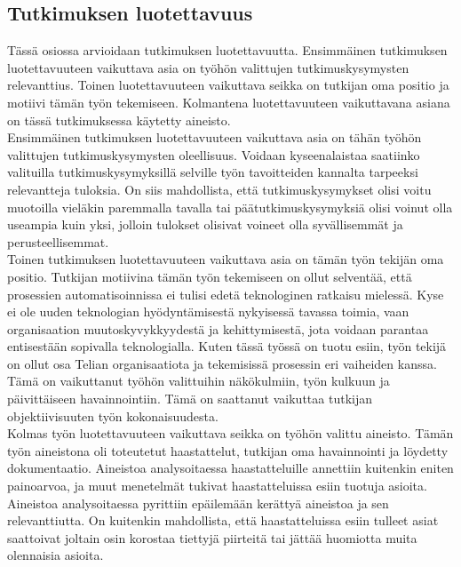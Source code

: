 \documentclass[finnish,12pt,a4paper,pdftex]{article}
\begin{document}
\subsection{Tutkimuksen luotettavuus}
Tässä osiossa arvioidaan tutkimuksen luotettavuutta. Ensimmäinen tutkimuksen luotettavuuteen vaikuttava asia on työhön valittujen tutkimuskysymysten relevanttius. Toinen luotettavuuteen vaikuttava seikka on tutkijan oma positio ja motiivi tämän työn tekemiseen. Kolmantena luotettavuuteen vaikuttavana asiana on tässä tutkimuksessa käytetty aineisto.\\

 Ensimmäinen tutkimuksen luotettavuuteen vaikuttava asia on tähän työhön valittujen tutkimuskysymysten oleellisuus. Voidaan kyseenalaistaa saatiinko valituilla tutkimuskysymyksillä selville työn tavoitteiden kannalta tarpeeksi relevantteja tuloksia. On siis mahdollista, että tutkimuskysymykset olisi voitu muotoilla vieläkin paremmalla tavalla tai päätutkimuskysymyksiä olisi voinut olla useampia kuin yksi, jolloin tulokset olisivat voineet olla syvällisemmät ja perusteellisemmat. \\

\noindent Toinen tutkimuksen luotettavuuteen vaikuttava asia on tämän työn tekijän oma positio. Tutkijan motiivina tämän työn tekemiseen on ollut selventää, että prosessien automatisoinnissa ei tulisi edetä teknologinen ratkaisu mielessä. Kyse ei ole uuden teknologian hyödyntämisestä nykyisessä tavassa toimia, vaan organisaation muutoskyvykkyydestä ja kehittymisestä, jota voidaan parantaa entisestään sopivalla teknologialla. Kuten tässä työssä on tuotu esiin, työn tekijä on ollut osa Telian organisaatiota ja tekemisissä prosessin eri vaiheiden kanssa. Tämä on vaikuttanut työhön valittuihin näkökulmiin, työn kulkuun ja päivittäiseen havainnointiin. Tämä on saattanut vaikuttaa tutkijan objektiivisuuten työn kokonaisuudesta.\\

\noindent Kolmas työn luotettavuuteen vaikuttava seikka on työhön valittu  aineisto. Tämän työn aineistona oli toteutetut haastattelut, tutkijan oma havainnointi ja löydetty dokumentaatio. Aineistoa analysoitaessa haastatteluille annettiin kuitenkin eniten painoarvoa, ja muut menetelmät tukivat haastatteluissa esiin tuotuja asioita. Aineistoa analysoitaessa pyrittiin epäilemään kerättyä aineistoa ja sen relevanttiutta. On kuitenkin mahdollista, että haastatteluissa esiin tulleet asiat saattoivat joltain osin korostaa tiettyjä piirteitä tai jättää huomiotta muita olennaisia asioita. 
\end{document}
